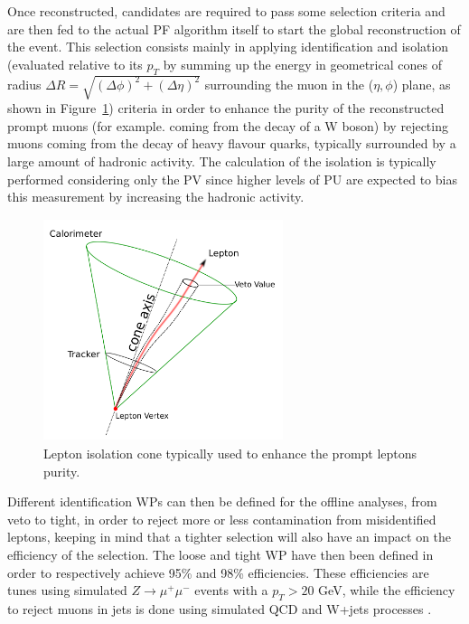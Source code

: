 \documentclass[a4paper, 10pt, openright]{report}
\begin{document}
Once reconstructed, candidates are required to pass some selection criteria and are then fed to the actual \ac{PF} algorithm itself to start the global reconstruction of the event. This selection consists mainly in applying identification and isolation (evaluated relative to its $p_T$ by summing up the energy in geometrical cones of radius $\Delta R = \sqrt{(\Delta \phi)^2 + (\Delta \eta)^2}$ surrounding the muon in the ($\eta, \phi$) plane, as shown in Figure~\ref{fig:IsoCone}) criteria in order to enhance the purity of the reconstructed prompt muons (for example. coming from the decay of a W boson) by rejecting muons coming from the decay of heavy flavour quarks, typically surrounded by a large amount of hadronic activity. The calculation of the isolation is typically performed considering only the \ac{PV} since higher levels of \ac{PU} are expected to bias this measurement by increasing the hadronic activity.

\begin{figure}[htbp]
\begin{center}
\includegraphics[width=7cm, height=6.5cm]{figs/IsoCone.png}
\caption{Lepton isolation cone typically used to enhance the prompt leptons purity.}
\label{fig:IsoCone}
\end{center}
\end{figure}

Different identification \acfp{WP} can then be defined for the offline analyses, from veto to tight, in order to reject more or less contamination from misidentified leptons, keeping in mind that a tighter selection will also have an impact on the efficiency of the selection. The loose and tight \ac{WP} have then been defined in order to respectively achieve 95\% and 98\% efficiencies. These efficiencies are tunes using simulated $Z \rightarrow \mu^+ \mu^-$ events with a $p_T > 20$ GeV, while the efficiency to reject muons in jets is done using simulated QCD and W+jets processes \cite{MuonSystemsEff}.
\end{document}
